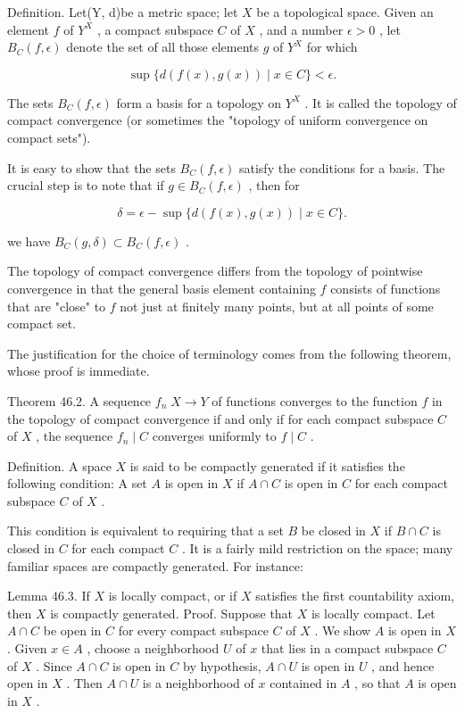 Definition. Let(Y, d)be a metric space; let \(X\) be a topological space. Given an element \(f\) of \({Y}^{X}\) , a compact subspace \(C\) of \(X\) , and a number \(\epsilon  > 0\) , let \({B}_{C}\left( {f,\epsilon }\right)\) denote the set of all those elements \(g\) of \({Y}^{X}\) for which

\[
\sup \{ d\left( {f\left( x\right) ,g\left( x\right) }\right)  \mid  x \in  C\}  < \epsilon .
\]

The sets \({B}_{C}\left( {f,\epsilon }\right)\) form a basis for a topology on \({Y}^{X}\) . It is called the topology of compact convergence (or sometimes the "topology of uniform convergence on compact sets").

It is easy to show that the sets \({B}_{C}\left( {f,\epsilon }\right)\) satisfy the conditions for a basis. The crucial step is to note that if \(g \in  {B}_{C}\left( {f,\epsilon }\right)\) , then for

\[
\delta  = \epsilon  - \sup \{ d\left( {f\left( x\right) ,g\left( x\right) }\right)  \mid  x \in  C\} .
\]

we have \({B}_{C}\left( {g,\delta }\right)  \subset  {B}_{C}\left( {f,\epsilon }\right)\) .

The topology of compact convergence differs from the topology of pointwise convergence in that the general basis element containing \(f\) consists of functions that are "close" to \(f\) not just at finitely many points, but at all points of some compact set.

The justification for the choice of terminology comes from the following theorem, whose proof is immediate.

Theorem 46.2. A sequence \({f}_{n}\;X \rightarrow  Y\) of functions converges to the function \(f\) in the topology of compact convergence if and only if for each compact subspace \(C\) of \(X\) , the sequence \({f}_{n} \mid  C\) converges uniformly to \(f \mid  C\) .

Definition. A space \(X\) is said to be compactly generated if it satisfies the following condition: A set \(A\) is open in \(X\) if \(A \cap  C\) is open in \(C\) for each compact subspace \(C\) of \(X\) .

This condition is equivalent to requiring that a set \(B\) be closed in \(X\) if \(B \cap  C\) is closed in \(C\) for each compact \(C\) . It is a fairly mild restriction on the space; many familiar spaces are compactly generated. For instance:

Lemma 46.3. If \(X\) is locally compact, or if \(X\) satisfies the first countability axiom, then \(X\) is compactly generated. Proof. Suppose that \(X\) is locally compact. Let \(A \cap  C\) be open in \(C\) for every compact subspace \(C\) of \(X\) . We show \(A\) is open in \(X\) . Given \(x \in  A\) , choose a neighborhood \(U\) of \(x\) that lies in a compact subspace \(C\) of \(X\) . Since \(A \cap  C\) is open in \(C\) by hypothesis, \(A \cap  U\) is open in \(U\) , and hence open in \(X\) . Then \(A \cap  U\) is a neighborhood of \(x\) contained in \(A\) , so that \(A\) is open in \(X\) .

